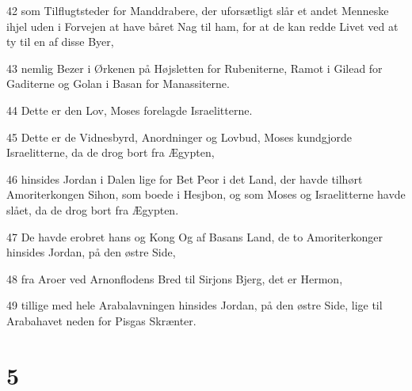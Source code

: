 \par 42 som Tilflugtsteder for Manddrabere, der uforsætligt slår et andet Menneske ihjel uden i Forvejen at have båret Nag til ham, for at de kan redde Livet ved at ty til en af disse Byer,
\par 43 nemlig Bezer i Ørkenen på Højsletten for Rubeniterne, Ramot i Gilead for Gaditerne og Golan i Basan for Manassiterne.
\par 44 Dette er den Lov, Moses forelagde Israelitterne.
\par 45 Dette er de Vidnesbyrd, Anordninger og Lovbud, Moses kundgjorde Israelitterne, da de drog bort fra Ægypten,
\par 46 hinsides Jordan i Dalen lige for Bet Peor i det Land, der havde tilhørt Amoriterkongen Sihon, som boede i Hesjbon, og som Moses og Israelitterne havde slået, da de drog bort fra Ægypten.
\par 47 De havde erobret hans og Kong Og af Basans Land, de to Amoriterkonger hinsides Jordan, på den østre Side,
\par 48 fra Aroer ved Arnonflodens Bred til Sirjons Bjerg, det er Hermon,
\par 49 tillige med hele Arabalavningen hinsides Jordan, på den østre Side, lige til Arabahavet neden for Pisgas Skrænter.

\chapter{5}


